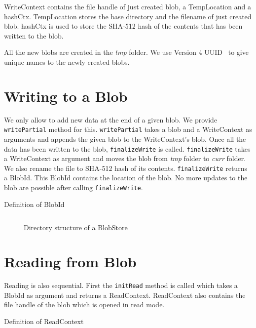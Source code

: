 WriteContext contains the file handle of just created blob, a TempLocation and a hashCtx. TempLocation stores the base directory and the filename of just created blob. hashCtx is used to store the SHA-512 hash of the contents that has been written to the blob.

All the new blobs are created in the \textit{tmp} folder. We use Version 4 UUID~\cite{leach2005universally} to give unique names to the newly created blobs.

\section{Writing to a Blob}
We only allow to add new data at the end of a given blob. We provide \texttt{writePartial} method for this. \texttt{writePartial} takes a blob and a WriteContext as arguments and appends the given blob to the WriteContext's blob.
Once all the data has been written to the blob, \texttt{finalizeWrite} is called. \texttt{finalizeWrite} takes a WriteContext as argument and moves the blob from \textit{tmp} folder to \textit{curr} folder. We also rename the file to SHA-512 hash of its contents.
\texttt{finalizeWrite} returns a BlobId. This BlobId contains the location of the blob.
No more updates to the blob are possible after calling \texttt{finalizeWrite}.

\begin{program}
  \caption{Definition of BlobId}
  \label{prog:defblobid}
  \inputminted{haskell}{hs/blobid.hs}
\end{program}

\begin{figure}[hbt]
  \caption{Directory structure of a BlobStore}
  \label{fig:blobstore-dirstructure}
\end{figure}

\section{Reading from Blob}
Reading is also sequential. First the \texttt{initRead} method is called which takes a BlobId as argument and returns a ReadContext. ReadContext also contains the file handle of the blob which is opened in read mode.

\begin{program}
  \caption{Definition of ReadContext}
  \label{fig:defreadcontext}
  \inputminted{haskell}{hs/readcontext.hs}
\end{program}

